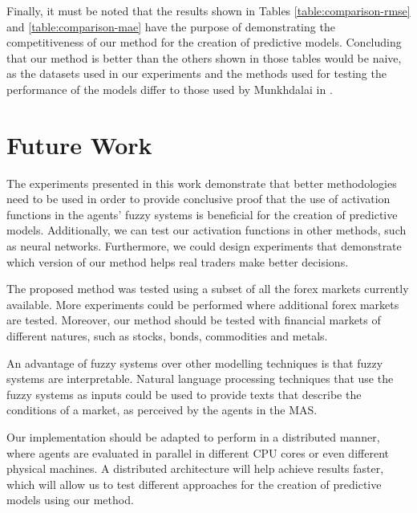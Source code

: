 ﻿\documentclass{ieeeaccess}
\begin{document}

Finally, it must be noted that the results shown in
Tables \ref{table:comparison-rmse} and \ref{table:comparison-mae} have the
purpose of demonstrating the competitiveness of our method for the
creation of predictive models. Concluding that our method is better
than the others shown in those tables would be naive, as the datasets
used in our experiments and the methods used for testing the
performance of the models differ to those used by Munkhdalai in
\cite{Munkhdalai2019}. %

\section{Future Work}
\label{section:future-work}

The experiments presented in this work demonstrate that better
methodologies need to be used in order to provide conclusive proof
that the use of activation functions in the agents' fuzzy systems is
beneficial for the creation of predictive models. Additionally, we can
test our activation functions in other methods, such as neural
networks. Furthermore, we could design experiments that demonstrate
which version of our method helps real traders make better decisions.

The proposed method was tested using a subset of all the forex markets
currently available. More experiments could be performed where
additional forex markets are tested. Moreover, our method should be
tested with financial markets of different natures, such as stocks,
bonds, commodities and metals.

An advantage of fuzzy systems over other modelling techniques is that
fuzzy systems are interpretable. Natural language processing
techniques that use the fuzzy systems as inputs could be used to
provide texts that describe the conditions of a market, as perceived
by the agents in the MAS.

Our implementation should be adapted to perform in a distributed
manner, where agents are evaluated in parallel in different CPU cores
or even different physical machines. A distributed architecture will
help achieve results faster, which will allow us to test different
approaches for the creation of predictive models using our method.
\end{document}
